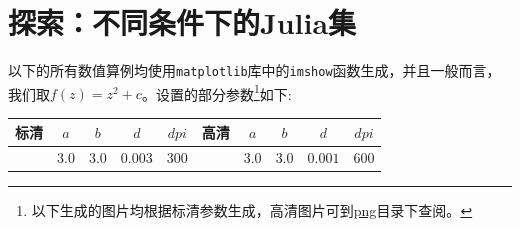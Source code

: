 \documentclass[a4paper]{ctexart}
\begin{document}
\section{探索：不同条件下的Julia集}
以下的所有数值算例均使用\verb|matplotlib|库中的\verb|imshow|函数生成，并且一般而言，我们取$f(z)=z^2+c$。设置的部分参数\footnote{以下生成的图片均根据标清参数生成，高清图片可到\href{run:./png/}{png}目录下查阅。}如下:
\begin{table}[htbp]
	\centering
	\begin{tabular}{|c|c|c|c|c|c|c|c|c|c|}
		\hline
		标清 & $a$ & $b$ & $d$ & $dpi$ & 高清 & $a$ & $b$ & $d$ & $dpi$ \\
		\hline
		 &$3.0$ & $3.0$ & $0.003$ & $300$ & & $3.0$ & $3.0$ & $0.001$ & $600$ \\
		\hline 
	\end{tabular}
\end{table}
\end{document}
